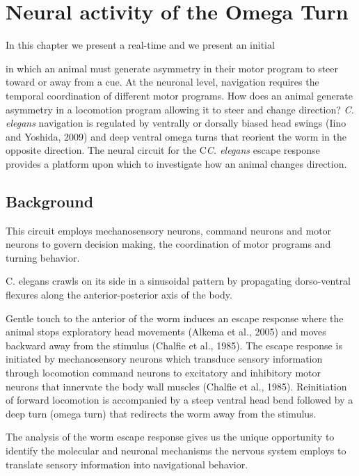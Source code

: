 
\chapter{Neural activity of the Omega Turn}

In this chapter we present a real-time and we present an initial 

 in which an animal must generate asymmetry in their motor program to steer toward or away from a cue.  At the neuronal level, navigation requires the temporal coordination of different motor programs.  How does an animal generate asymmetry in a locomotion program allowing it to steer and change direction?  \textit{C. elegans} navigation is regulated by ventrally or dorsally biased head swings (Iino and Yoshida, 2009) and deep ventral omega turns that reorient the worm in the opposite direction.  The neural circuit for the C\textit{C. elegans} escape response provides a platform upon which to investigate how an animal changes direction.  


\section{Background}

This circuit employs mechanosensory neurons, command neurons and motor neurons to govern decision making, the coordination of motor programs and turning behavior. 

C. elegans crawls on its side in a sinusoidal pattern by propagating dorso-ventral flexures along the anterior-posterior axis of the body.  


Gentle touch to the anterior of the worm induces an escape response where the animal stops exploratory head movements (Alkema et al., 2005) and moves backward away from the stimulus (Chalfie et al., 1985).  The escape response is initiated by mechanosensory neurons which transduce sensory information through locomotion command neurons to excitatory and inhibitory motor neurons that innervate the body wall muscles (Chalfie et al., 1985).  Reinitiation of forward locomotion is accompanied by a steep ventral head bend followed by a deep turn (omega turn) that redirects the worm away from the stimulus.  

The analysis of the worm escape response gives us the unique opportunity to identify the molecular and neuronal mechanisms  the nervous system employs to translate sensory information into navigational behavior. 

